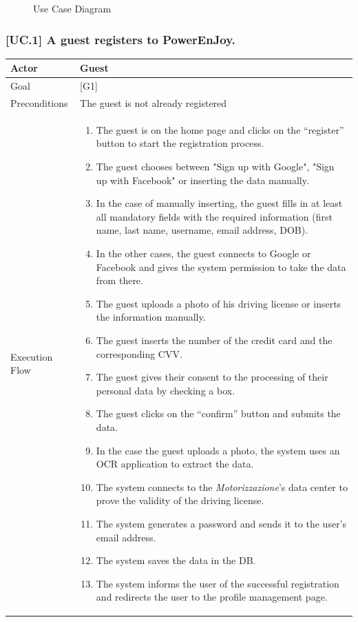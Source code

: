 \documentclass[english]{article}
\begin{document}
	\begin{figure}
		\centering
		\makebox[\textwidth][c]{
			\def\svgwidth{500pt}

			
		}
		\caption{Use Case Diagram}
	\end{figure}
	\newpage
	\subsubsection{[UC.1] A guest registers to PowerEnJoy.}
	\begin{tabularx}{\textwidth}{  l  X  }
		\hline
		Actor & Guest\\
		\hline
		Goal & [G1]\\
		\hline
		Preconditions & The guest is not already registered\\
		\hline
		Execution Flow & \begin{enumerate}
			\item{The guest is on the home page and clicks on the “register” button to start the registration process.}
			\item{The guest chooses between "Sign up with Google", "Sign up with Facebook" or inserting the data manually.}
			\item{In the case of manually inserting, the guest fills in at least all mandatory fields with the required information (first name, last name, username, email address, DOB).}
			\item{In the other cases, the guest connects to Google or Facebook and gives the system permission to take the data from there.}
			\item{The guest uploads a photo of his driving license or inserts the information manually.}
			\item{The guest inserts the number of the credit card and the corresponding CVV}.
			\item{The guest gives their consent to the processing of their personal data by checking a box.}
			\item{The guest clicks on the “confirm” button and submits the data.}
      \item{In the case the guest uploads a photo, the system uses an OCR application to extract the data.}
      \item{The system connects to the \textit{Motorizzazione}'s data center to prove the validity of the driving license.}
			\item{The system generates a password and sends it to the user's email address.}
			\item{The system  saves the data in the DB.}
			\item{The system informs the user of the successful registration and redirects the user to the profile management page.}
		\end{enumerate}\\
		\hline
	\end{tabularx}
\end{document}
